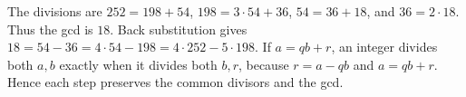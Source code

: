 The divisions are $252=198+54$, $198=3\cdot54+36$, $54=36+18$, and $36=2\cdot18$. Thus the gcd is $18$. Back substitution gives $18=54-36=4\cdot54-198=\boxed{4\cdot252-5\cdot198}$. If $a=qb+r$, an integer divides both $a,b$ exactly when it divides both $b,r$, because $r=a-qb$ and $a=qb+r$. Hence each step preserves the common divisors and the gcd.
